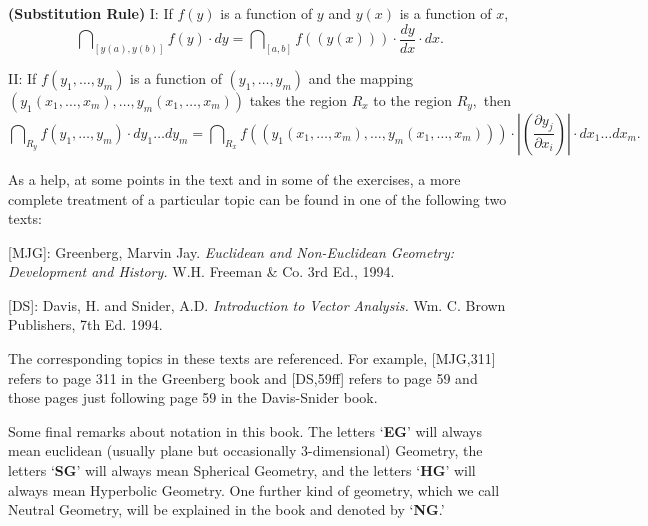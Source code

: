 \documentclass{ximera}
\begin{document}
\begin{theorem}
\textbf{(Substitution Rule)} I: If $f\left( y\right) $ is a function of $y$
and $y\left( x\right) $ is a function of $x$,%
\begin{equation*}
\dint \nolimits_{\left[ y\left( a\right) ,y\left( b\right) \right] }f\left(
y\right) \cdot dy=\dint \nolimits_{\left[ a,b\right] }f\left( \left( y\left(
x\right) \right) \right) \cdot\frac{dy}{dx}\cdot dx. 
\end{equation*}

II: If $f\left( y_{1},\ldots ,y_{m}\right) $ is a function of $\left(
y_{1},\ldots ,y_{m}\right) $ and the mapping $\left( y_{1}\left(
x_{1},\ldots ,x_{m}\right) ,\ldots ,y_{m}\left( x_{1},\ldots ,x_{m}\right)
\right) $ takes the region $R_{x}$ to the region $R_{y},$ then%
\begin{equation}
\dint\nolimits_{R_{y}}f\left( y_{1},\ldots ,y_{m}\right) \cdot dy_{1}\ldots
dy_{m}=\dint\nolimits_{R_{x}}f\left( \left( y_{1}\left( x_{1},\ldots
,x_{m}\right) ,\ldots ,y_{m}\left( x_{1},\ldots ,x_{m}\right) \right)
\right) \cdot \left\vert \left( \frac{\partial y_{j}}{\partial x_{i}}\right)
\right\vert \cdot dx_{1}\ldots dx_{m}.  \label{SuR}
\end{equation}
\end{theorem}

As a help, at some points in the text and in some of the exercises, a more
complete treatment of a particular topic can be found in one of the following
two texts:

[MJG]: Greenberg, Marvin Jay. \textit{Euclidean and Non-Euclidean Geometry:
Development and History.} W.H. Freeman \& Co. 3rd Ed., 1994.

[DS]: Davis, H. and Snider, A.D. \textit{Introduction to Vector Analysis.} Wm.
C. Brown Publishers, 7th Ed. 1994.

The corresponding topics in these texts are referenced. For example, [MJG,311]
refers to page 311 in the Greenberg book and [DS,59ff] refers to page 59 and
those pages just following page 59 in the Davis-Snider book.

Some final remarks about notation in this book. The letters `\textbf{EG}' will
always mean euclidean (usually plane but occasionally $3$-dimensional)
Geometry, the letters `\textbf{SG}' will always mean Spherical Geometry, and
the letters `\textbf{HG}' will always mean Hyperbolic Geometry. One further
kind of geometry, which we call Neutral Geometry, will be explained in the
book and denoted by `\textbf{NG}.'
\end{document}
